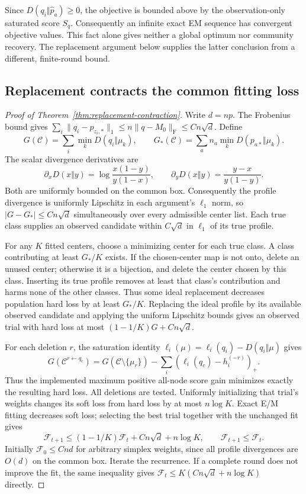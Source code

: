 \documentclass[11pt]{article}
\theoremstyle{definition}
\theoremstyle{remark}
\numberwithin{equation}{section}
\begin{document}
Since $D(q_i\Vert\widehat p_a)\ge0$, the objective is bounded above by the observation-only saturated score $S_q$. Consequently an infinite exact EM sequence has convergent objective values. This fact alone gives neither a global optimum nor community recovery. The replacement argument below supplies the latter conclusion from a different, finite-round bound.


\subsection{Replacement contracts the common fitting loss}
\begin{proof}[Proof of Theorem~\ref{thm:replacement-contraction}]
Write $d=np$. The Frobenius bound gives $\sum_i\|q_i-p_{z_i,*}\|_1\le n\|q-M_0\|_{\mathrm F}\le Cn\sqrt d$. Define
\[
 G(\mathcal C)=\sum_i\min_kD(q_i\Vert\mu_k),\qquad
 G_*(\mathcal C)=\sum_an_a\min_kD(p_{a*}\Vert\mu_k).
\]
The scalar divergence derivatives are
\[
 \partial_x D(x\Vert y)=\log\frac{x(1-y)}{y(1-x)},\qquad
 \partial_y D(x\Vert y)=\frac{y-x}{y(1-y)}.
\]
Both are uniformly bounded on the common box. Consequently the profile divergence is uniformly Lipschitz in each argument's $\ell_1$ norm, so $|G-G_*|\le Cn\sqrt d$ simultaneously over every admissible center list. Each true class supplies an observed candidate within $C\sqrt d$ in $\ell_1$ of its true profile.

For any $K$ fitted centers, choose a minimizing center for each true class. A class contributing at least $G_*/K$ exists. If the chosen-center map is not onto, delete an unused center; otherwise it is a bijection, and delete the center chosen by this class. Inserting its true profile removes at least that class's contribution and harms none of the other classes. Thus some ideal replacement decreases population hard loss by at least $G_*/K$. Replacing the ideal profile by its available observed candidate and applying the uniform Lipschitz bounds gives an observed trial with hard loss at most $(1-1/K)G+Cn\sqrt d$.

For each deletion $r$, the saturation identity $\ell_i(\mu)=\ell_i(q_i)-D(q_i\Vert\mu)$ gives
\begin{equation}
 G(\mathcal C^{r\leftarrow q_c})
 =G(\mathcal C\setminus\{\mu_r\})
  -\sum_i(\ell_i(q_c)-h_i^{(-r)})_+.
 \label{eq:gain-hard-loss-identity}
\end{equation}
Thus the implemented maximum positive all-node score gain minimizes exactly the resulting hard loss. All deletions are tested. Uniformly initializing that trial's weights changes its soft loss from hard loss by at most $n\log K$. Exact E/M fitting decreases soft loss; selecting the best trial together with the unchanged fit gives
\[
 \mathcal F_{t+1}\le(1-1/K)\mathcal F_t+Cn\sqrt d+n\log K,
 \qquad \mathcal F_{t+1}\le\mathcal F_t.
\]
Initially $\mathcal F_0\le Cnd$ for arbitrary simplex weights, since all profile divergences are $O(d)$ on the common box. Iterate the recurrence. If a complete round does not improve the fit, the same inequality gives $\mathcal F_t\le K(Cn\sqrt d+n\log K)$ directly.
\end{proof}
\end{document}
